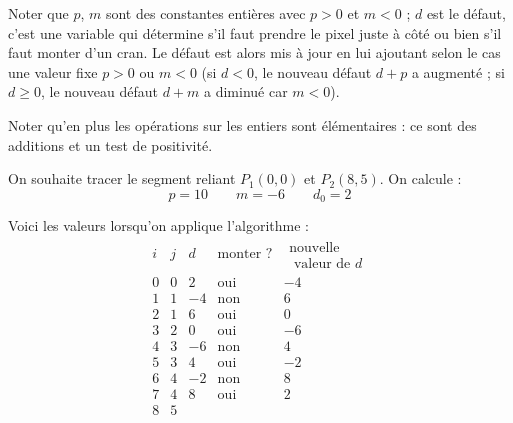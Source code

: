\documentclass[11pt,class=report,crop=false]{standalone}
\begin{document}
Noter que $p$, $m$ sont des constantes entières avec $p>0$ et $m<0$ ; $d$ est le \og{}défaut\fg{}, c'est une variable qui détermine s'il faut prendre le pixel juste à côté ou bien s'il faut monter d'un cran. Le défaut est alors mis à jour en lui ajoutant selon le cas une valeur fixe $p>0$ ou $m<0$ (si $d < 0$, le nouveau défaut $d+p$ a augmenté ; si $d \ge 0$, le nouveau défaut $d+m$ a diminué car $m<0$).


Noter qu'en plus les opérations sur les entiers sont élémentaires : ce sont des additions et un test de positivité.

\begin{exemple}	

On souhaite tracer le segment reliant $P_1(0,0)$ et $P_2(8,5)$.
On calcule :
$$p=10 \qquad  m=-6 \qquad d_0=2$$

Voici les valeurs lorsqu'on applique l'algorithme :
$$\begin{array}{ccccc}
i & j & d   &  \text{monter ?}		& \begin{array}{c}\text{nouvelle}\\ \text{ valeur de } d \end{array} \\ \hline
0 & 0 & 2   & \text{oui} & -4 \\
1 & 1 & -4  & \text{non} &  6 \\
2 & 1 & 6   & \text{oui} & 0 \\
3 & 2 & 0   & \text{oui} & -6 \\
4 & 3 & -6  & \text{non} &  4 \\
5 & 3 & 4   & \text{oui} & -2 \\
6 & 4 & -2  & \text{non} &  8 \\
7 & 4 & 8   & \text{oui} & 2 \\
8 & 5 &     &     &  \\	
\end{array}
$$
	

\end{exemple}
\end{document}
